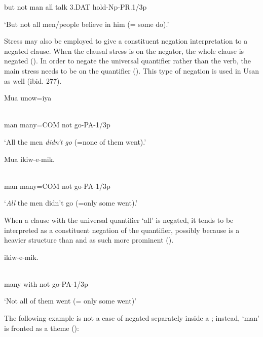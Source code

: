 but  not  man  all  talk  3.DAT  hold-Np-PR.1/3p

`But not all men/people believe in him (= some do).'

Stress may also be employed to give a constituent negation interpretation to a negated clause. When the clausal stress is on the negator, the whole clause is negated (). In order to negate the universal quantifier rather than the verb, the main stress needs to be on the quantifier (). This type of negation is used in Usan as well (ibid. 277).

\ea%
\label{ex:x669}
\gll Mua \textstyleEmphasizedVernacularWords{} unow=iya     \\
      \\
\glt
\z

man  many=COM  not  go-PA-1/3p

`All the men \textit{didn't go} (=none of them went).'

\ea%
\label{ex:x671}
\gll Mua     ikiw-e-mik. \\
      \\
\glt
\z

man  many=COM  not  go-PA-1/3p

`\textit{All} the men didn't go (=only some went).'

When a clause with the universal quantifier  `all' is negated, it tends to be interpreted as a constituent negation of the quantifier, possibly because  is a heavier structure than  and as such more prominent ().

\ea%
\label{ex:x668}
\gll {}  ikiw-e-mik. \\
      \\
\glt
\z

many  with  not  go-PA-1/3p

`Not all of them went (= only some went)'

The following example is not a case of  negated separately inside a ; instead,  `man' is fronted as a theme ():

